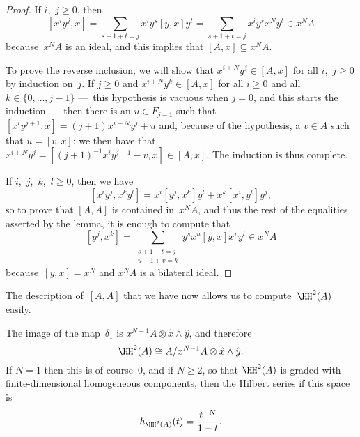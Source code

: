\begin{proof}
If $i$,~$j\geq0$, then 
  \[
  [x^iy^j,x] 
        = \sum_{s+1+t=j}x^iy^s[y,x]y^t
        = \sum_{s+1+t=j}x^iy^sx^Ny^t
        \in x^NA
  \]
because~$x^NA$ is an ideal, and this implies that $[A,x]\subseteq x^NA$.

To prove the reverse inclusion, we will show that $x^{i+N}y^j\in[A,x]$ for
all $i$,~$j\geq0$ by induction on~$j$. If $j\geq0$ and
$x^{i+N}y^k\in[A,x]$ for all $i\geq0$ and all $k\in\{0,\dots,j-1\}$ ---~this
hypothesis is vacuous when $j=0$, and this starts the induction~--- then
there is an $u\in F_{j-1}$ such that $[x^iy^{j+1},x] = (j+1)x^{i+N}y^j +
u$ and, because of the hypothesis, a $v\in A$ such that $u=[v,x]$: we then
have that $x^{i+N}y^j=[(j+1)^{-1}x^iy^{j+1}-v,x]\in[A,x]$. The induction is
thus complete.

If $i$,~$j$,~$k$,~$l\geq0$, then we have
  \[
  [x^iy^j,x^ky^l]
        = x^i[y^j,x^k]y^l + x^k[x^i,y^l]y^j,
  \]
so to prove that $[A,A]$ is contained in~$x^NA$, and thus the rest of the
equalities asserted by the lemma, it is enough to compute
that
  \[
  [y^j,x^k]
        = \sum_{\substack{s+1+t=j\\u+1+v=k}}
                y^sx^u[y,x]x^vy^t
        \in x^NA
  \]
because~$[y,x]=x^N$ and $x^NA$ is a bilateral ideal.
\end{proof}

The description of~$[A,A]$ that we have now allows us to compute~$\HH^2(A)$
easily.

\begin{Lemma}
The image of the map~$\delta_1$ is $x^{N-1}A\otimes\hat x\wedge\hat y$, and
therefore 
  \[
  \HH^2(A)\cong A/x^{N-1}A\otimes\hat x\wedge\hat y.
  \]
If $N=1$ then this is of course~$0$, and if $N\geq2$, so that $\HH^2(A)$ is
graded with finite-dimensional homogeneous components, then the
Hilbert series if this space is
  \[
  h_{\HH^2(A)}(t) = \frac{t^{-N}}{1-t}.
  \]
\end{Lemma}


